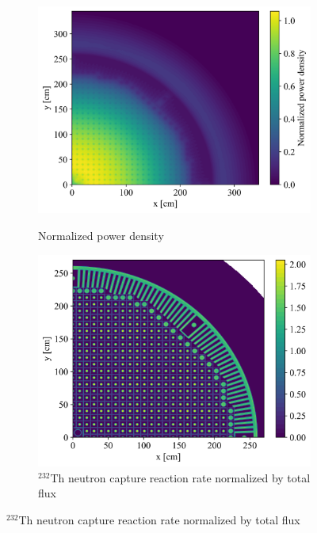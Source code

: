 \documentclass[letterpaper]{article}
\begin{document}
\begin{figure}[ht]
   \begin{subfigure}{.5\textwidth}
   \includegraphics[width=\textwidth]{./power_distribution.png}
        \label{fig:power_dens}
   \caption{Normalized power density}
   \end{subfigure}
   \begin{subfigure}{.5\textwidth}
          \includegraphics[width=\textwidth]{./breeding_distribution.png}
   \caption{$^{232}$Th neutron capture reaction rate normalized by total flux}
        \label{fig:breed_dens}
   \end{subfigure}
    \end{figure}
\end{document}
